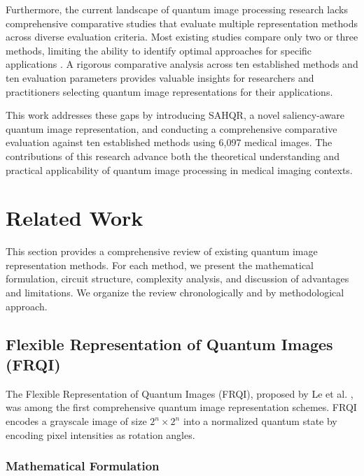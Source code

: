 \documentclass[pdflatex,sn-mathphys-num,Numbered]{sn-jnl}
\theoremstyle{thmstyleone}
\theoremstyle{thmstyletwo}
\theoremstyle{thmstylethree}
\begin{document}
Furthermore, the current landscape of quantum image processing research lacks comprehensive comparative studies that evaluate multiple representation methods across diverse evaluation criteria. Most existing studies compare only two or three methods, limiting the ability to identify optimal approaches for specific applications \cite{bib42}. A rigorous comparative analysis across ten established methods and ten evaluation parameters provides valuable insights for researchers and practitioners selecting quantum image representations for their applications.

This work addresses these gaps by introducing SAHQR, a novel saliency-aware quantum image representation, and conducting a comprehensive comparative evaluation against ten established methods using 6,097 medical images. The contributions of this research advance both the theoretical understanding and practical applicability of quantum image processing in medical imaging contexts.




\section{Related Work}\label{sec:related}

This section provides a comprehensive review of existing quantum image representation methods. For each method, we present the mathematical formulation, circuit structure, complexity analysis, and discussion of advantages and limitations. We organize the review chronologically and by methodological approach.

\subsection{Flexible Representation of Quantum Images (FRQI)}

The Flexible Representation of Quantum Images (FRQI), proposed by Le et al. \cite{bib18}, was among the first comprehensive quantum image representation schemes. FRQI encodes a grayscale image of size $2^n \times 2^n$ into a normalized quantum state by encoding pixel intensities as rotation angles.

\subsubsection{Mathematical Formulation}
\end{document}
